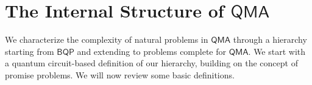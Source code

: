 \documentclass[11pt]{article}
\newcommand{\ms}[1]{\mathsf{#1}}
\begin{document}

\section{The Internal Structure of $\ms{QMA}$}
We characterize the complexity of natural problems in $\ms{QMA}$ through a hierarchy starting from $\ms{BQP}$ and extending to problems complete for $\ms{QMA}$. We start with a quantum circuit-based definition of our hierarchy, building on the concept of promise problems. We will now review some basic definitions.
\end{document}
